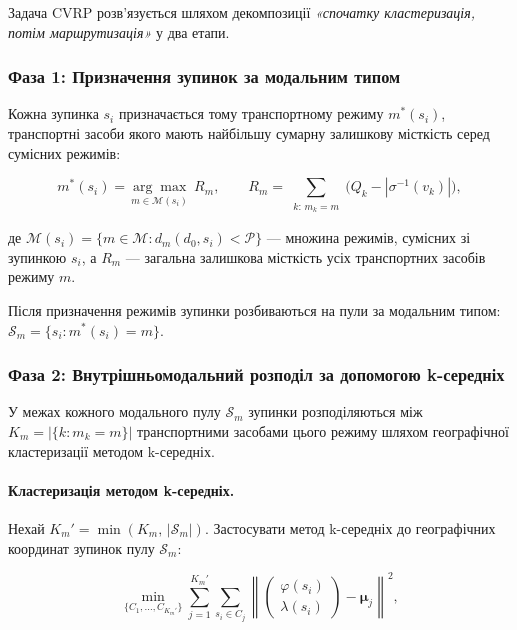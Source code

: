 \documentclass[12pt, a4paper]{article}
\theoremstyle{definition}
\begin{document}
Задача CVRP розв'язується шляхом декомпозиції \emph{«спочатку кластеризація,
потім маршрутизація»} у два етапи.

\subsubsection{Фаза 1: Призначення зупинок за модальним типом}

Кожна зупинка $s_i$ призначається тому транспортному режиму $m^*(s_i)$,
транспортні засоби якого мають найбільшу сумарну залишкову місткість серед
сумісних режимів:

\begin{equation}
  \label{eq:mode_assign}
  m^*(s_i) = \underset{m \in \mathcal{M}(s_i)}{\arg\max}\;
    R_m, \qquad
  R_m = \sum_{\substack{k:\, m_k = m}} \bigl(Q_k - |\sigma^{-1}(v_k)|\bigr),
\end{equation}

\noindent де $\mathcal{M}(s_i) = \{m \in \mathcal{M} : d_m(d_0, s_i) < \mathcal{P}\}$
--- множина режимів, сумісних зі зупинкою $s_i$, а $R_m$ --- загальна залишкова
місткість усіх транспортних засобів режиму $m$.

Після призначення режимів зупинки розбиваються на пули за модальним типом:
$\mathcal{S}_m = \{s_i : m^*(s_i) = m\}$.

\subsubsection{Фаза 2: Внутрішньомодальний розподіл за допомогою k-середніх}

У межах кожного модального пулу $\mathcal{S}_m$ зупинки розподіляються між
$K_m = |\{k : m_k = m\}|$ транспортними засобами цього режиму шляхом
географічної кластеризації методом k-середніх.

\paragraph{Кластеризація методом k-середніх.}
Нехай $K_m' = \min(K_m,\, |\mathcal{S}_m|)$. Застосувати метод k-середніх до
географічних координат зупинок пулу $\mathcal{S}_m$:

\begin{equation}
  \label{eq:kmeans}
  \min_{\{C_1,\ldots,C_{K_m'}\}}
    \sum_{j=1}^{K_m'} \sum_{s_i \in C_j}
    \left\| \begin{pmatrix} \varphi(s_i) \\ \lambda(s_i) \end{pmatrix}
           - \boldsymbol{\mu}_j \right\|^2,
\end{equation}
\end{document}
